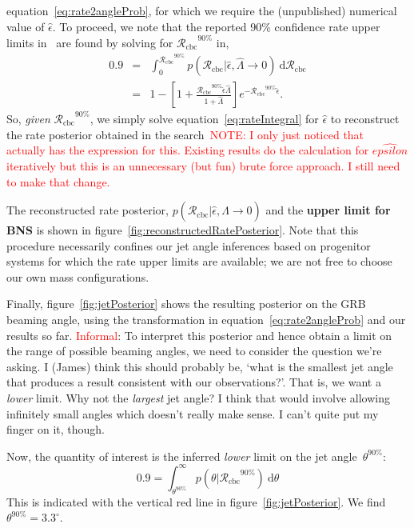 \documentclass[twocolumn,nofootinbib]{revtex4}
\newcommand{\cbcrate}{{{\mathcal R}_{\mathrm{cbc}}}}
\newcommand{\diff}{{\mathrm d}}
\begin{document}
equation~\ref{eq:rate2angleProb}, for which we require the (unpublished) numerical
value of $\hat{\epsilon}$.  To proceed, we note that the reported 90\%
confidence rate upper limits in~\cite{S6lowmass} are found by solving for
$\cbcrate^{90\%}$ in,
%
\begin{eqnarray}
0.9 & = &\int_0^{\cbcrate^{90\%}} p(\cbcrate | \hat{\epsilon}, \hat{\Lambda} \to
0)~\diff \cbcrate \nonumber \\
& = & 1 -
\left[1+\frac{\cbcrate^{90\%}\hat{\epsilon}\hat{\Lambda}}{1+\hat{\Lambda}}\right]
e^{-\cbcrate^{90\%} \hat{\epsilon}}.
\label{eq:rateIntegral}
\end{eqnarray}
%
So, \emph{given} $\cbcrate^{90\%}$, we simply solve
equation~\ref{eq:rateIntegral} for $\hat{\epsilon}$ to reconstruct the rate
posterior obtained in the search~\textcolor{red}{NOTE: I only just noticed
that~\cite{Biswas09} actually has the expression for this.  Existing results do
the calculation for $\hat{epsilon}$ iteratively but this is an unnecessary (but
fun) brute force approach.  I still need to make that change.}

The reconstructed rate posterior, $p(\cbcrate | \hat{\epsilon}, \hat{\Lambda}
\to 0)$ and the {\bf upper limit for BNS} is shown in
figure~\ref{fig:reconstructedRatePosterior}.  Note that this procedure
necessarily confines our jet angle inferences based on progenitor systems for
which the rate upper limits are available; we are not free to choose our own
mass configurations.

Finally, figure~\ref{fig:jetPosterior} shows the resulting posterior on the GRB
beaming angle, using the transformation in equation~\ref{eq:rate2angleProb} and
our results so far.  \textcolor{red}{Informal}: To interpret this posterior and
hence obtain a limit on the range of possible beaming angles, we need to
consider the question we're asking.  I (James) think this should probably be,
`what is the smallest jet angle that produces a result consistent with our
observations?'.  That is, we want a \emph{lower} limit.  Why not the
\emph{largest} jet angle?  I think that would involve allowing infinitely small
angles which doesn't really make sense.  I can't quite put my finger on it,
though.

Now, the quantity of interest is the inferred \emph{lower}
limit on the jet angle~$\theta^{90\%}$:
%
\begin{equation}
0.9 = \int_{\theta^{90\%}}^{\infty}p(\theta | \cbcrate^{90\%})~\diff \theta
\end{equation}
%
This is indicated with the vertical red line in figure~\ref{fig:jetPosterior}.
We find $\theta^{90\%}=3.3^{\circ}$.
\end{document}
